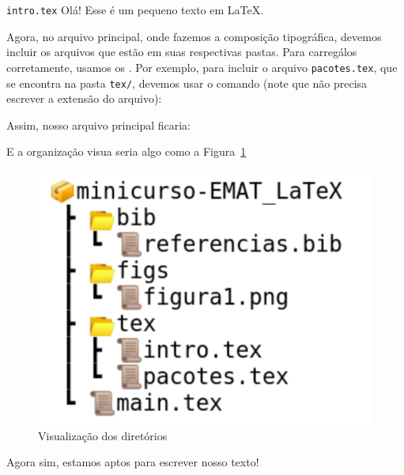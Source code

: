 \begin{codigo}{\texttt{intro.tex}}{\lapis}
Olá! Esse é um pequeno texto em \LaTeX.
\end{codigo}

Agora, no arquivo principal, onde fazemos a composição tipográfica, devemos incluir 
os arquivos que estão em suas respectivas pastas.
Para carregálos corretamente, usamos os {}.
Por exemplo, para incluir o arquivo \texttt{pacotes.tex}, que se encontra na pasta 
\texttt{tex/}, devemos usar o comando (note que não precisa escrever a extensão 
do arquivo):\\


Assim, nosso arquivo principal ficaria:


E a organização visua seria algo como a Figura~\ref{fig:diretorios}

\begin{figure}[!htbp]
  \centering
  \includegraphics[width=0.45\linewidth]{diretorios}
  \caption{Visualização dos diretórios}
  \label{fig:diretorios}  
\end{figure}

Agora sim, estamos aptos para escrever nosso texto!

\newpage